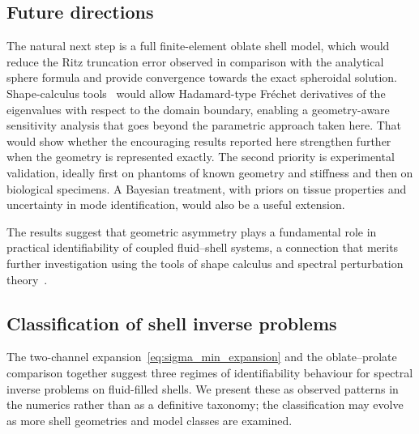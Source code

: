 \subsection{Future directions}

The natural next step is a full finite-element oblate shell model, which would
reduce the Ritz truncation error observed in comparison with the analytical
sphere formula and provide convergence towards the exact spheroidal solution.  Shape-calculus tools~\cite{DelfourZolesio2011} would allow
Hadamard-type Fr\'echet derivatives of the eigenvalues with respect to the
domain boundary, enabling a geometry-aware sensitivity analysis that goes beyond
the parametric approach taken here.  That would show whether the encouraging
results reported here strengthen further when the geometry is represented
exactly.  The second
priority is experimental validation, ideally first on phantoms of known
geometry and stiffness and then on biological specimens.  A Bayesian treatment,
with priors on tissue properties and uncertainty in mode identification, would
also be a useful extension.

The results suggest that geometric asymmetry plays a fundamental role in
practical identifiability of coupled fluid--shell systems, a connection that
merits further investigation using the tools of shape calculus and spectral
perturbation theory~\cite{Kato1966,Henrot2006}.

\subsection{Classification of shell inverse problems}\label{sec:classification}

The two-channel expansion~\eqref{eq:sigma_min_expansion} and the
oblate--prolate comparison together suggest three regimes of identifiability
behaviour for spectral inverse problems on fluid-filled shells.  We present
these as observed patterns in the numerics rather than as a definitive
taxonomy; the classification may evolve as more shell geometries and model
classes are examined.

